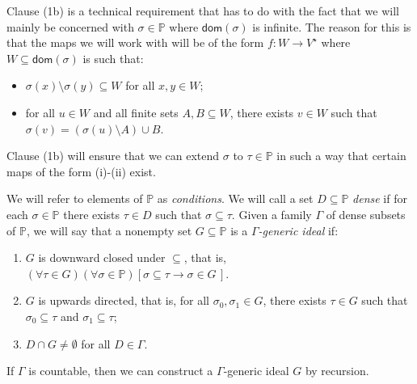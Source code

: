 \documentclass[10pt,a4paper, openany,  oldfontcommands]{memoir}
\newtheorem{open problem} [theorem] {Open Problem}
\begin{document}
Clause (1b) is a  technical requirement that  has  to do with the fact that we will  mainly be concerned  with $  \sigma \in  \mathbb{P} $  where  $  \mathsf{dom} \left(  \sigma  \right)  $  is infinite. 
The reason for this is that   the maps we will  work with will be of the form   $  f  :  W   \to   V^{  \star }  $
where $  W  \subseteq    \mathsf{dom} \left(  \sigma  \right)    $  is such that: 
\begin{itemize}
\item[(i)]  $  \sigma (x)  \setminus  \sigma (y)   \subseteq   W  $  for all $  x, y  \in W  $; 



\item[(ii)]  for all   $  u  \in W $  and all  finite  sets $  A, B  \subseteq  W  $,  there exists  $  v \in  W  $  such that  
$  \sigma (v)  =  \left(   \sigma (u )  \setminus  A   \right)   \cup   B  $. 
\end{itemize}
 Clause (1b) will ensure that we can extend $  \sigma  $  to  $  \tau  \in  \mathbb{P} $ in  such a way that  certain maps of the form (i)-(ii) exist. 
 






We will refer to elements of   $  \mathbb{P}  $  as  \emph{conditions}. 
We will call a set $D  \subseteq     \mathbb{P}   $   \emph{dense} if for each  $\sigma \in  \mathbb{P}    $  there exists  $ \tau  \in   D  $ 
such that $  \sigma  \subseteq    \tau $. 
Given a   family $  \Gamma $  of dense subsets of    $ \mathbb{P}    $, 
we  will say that  a  nonempty set  $  G  \subseteq   \mathbb{P}   $ is a   \emph{$  \Gamma $-generic ideal}  if: 
\begin{enumerate}
\item    $G$ is downward closed under $  \subseteq    $,  that is, 
$  \left(  \forall  \tau   \in G  \right)   \left(   \forall  \sigma  \in  \mathbb{P} \right)  \left[  
 \sigma  \subseteq   \tau    \rightarrow    \sigma  \in G    \,   \right]  
$.  
\item $G$ is upwards directed,  that is,   for all  $  \sigma_0,  \sigma_1  \in G $,   there exists  $  \tau \in G $ such that 
$  \sigma_0   \subseteq    \tau $  and  $  \sigma_1 \subseteq    \tau $; 

\item  $  D  \cap  G \neq  \emptyset $  for   all $  D  \in \Gamma $. 
\end{enumerate}
If $  \Gamma$ is countable, 
then we can  construct  a $  \Gamma$-generic ideal  $ G $  by recursion. 
\end{document}
